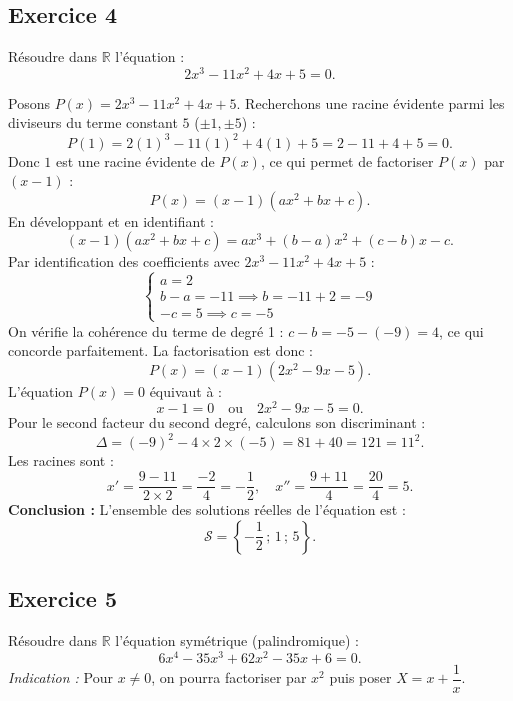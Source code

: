 \documentclass[11pt,a4paper]{article}
\newcommand{\R}{\mathbb{R}}
\begin{document}
\subsection*{Exercice 4}
Résoudre dans $\R$ l'équation :
\[
2x^3 - 11x^2 + 4x + 5 = 0.
\]

\begin{correctionbox}
Posons $P(x) = 2x^3 - 11x^2 + 4x + 5$.
Recherchons une racine évidente parmi les diviseurs du terme constant $5$ ($\pm 1, \pm 5$) :
\[
P(1) = 2(1)^3 - 11(1)^2 + 4(1) + 5 = 2 - 11 + 4 + 5 = 0.
\]
Donc $1$ est une racine évidente de $P(x)$, ce qui permet de factoriser $P(x)$ par $(x - 1)$ :
\[
P(x) = (x - 1)(ax^2 + bx + c).
\]
En développant et en identifiant :
\[
(x - 1)(ax^2 + bx + c) = ax^3 + (b - a)x^2 + (c - b)x - c.
\]
Par identification des coefficients avec $2x^3 - 11x^2 + 4x + 5$ :
\[
\begin{cases}
a = 2\\
b - a = -11 \implies b = -11 + 2 = -9\\
-c = 5 \implies c = -5
\end{cases}
\]
On vérifie la cohérence du terme de degré 1 : $c - b = -5 - (-9) = 4$, ce qui concorde parfaitement.
La factorisation est donc :
\[
P(x) = (x - 1)(2x^2 - 9x - 5).
\]
L'équation $P(x) = 0$ équivaut à :
\[
x - 1 = 0 \quad \text{ou} \quad 2x^2 - 9x - 5 = 0.
\]
Pour le second facteur du second degré, calculons son discriminant :
\[
\Delta = (-9)^2 - 4 \times 2 \times (-5) = 81 + 40 = 121 = 11^2.
\]
Les racines sont :
\[
x' = \frac{9 - 11}{2 \times 2} = \frac{-2}{4} = -\frac{1}{2}, \quad x'' = \frac{9 + 11}{4} = \frac{20}{4} = 5.
\]
\textbf{Conclusion :} L'ensemble des solutions réelles de l'équation est :
\[
\mathcal{S} = \left\{-\frac{1}{2}\,;\, 1\,;\, 5\right\}.
\]
\end{correctionbox}

\subsection*{Exercice 5}
Résoudre dans $\R$ l'équation symétrique (palindromique) :
\[
6x^4 - 35x^3 + 62x^2 - 35x + 6 = 0.
\]
\textit{Indication :} Pour $x \ne 0$, on pourra factoriser par $x^2$ puis poser $X = x + \dfrac{1}{x}$.
\end{document}
